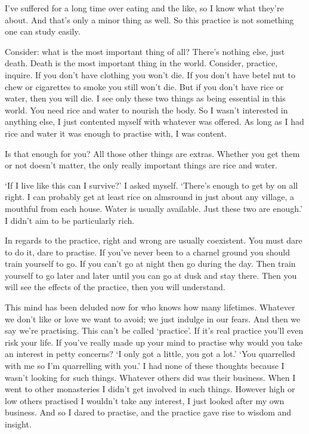 I've suffered for a long time over eating and the like, so I know what they're about. And that's only a minor thing as well. So this practice is not something one can study easily. 

Consider: what is the most important thing of all? There's nothing else, just death. Death is the most important thing in the world. Consider, practice, inquire. If you don't have clothing you won't die. If you don't have betel nut to chew or cigarettes to smoke you still won't die. But if you don't have rice or water, then you will die. I see only these two things as being essential in this world. You need rice and water to nourish the body. So I wasn't interested in anything else, I just contented myself with whatever was offered. As long as I had rice and water it was enough to practise with, I was content. 

Is that enough for you? All those other things are extras. Whether you get them or not doesn't matter, the only really important things are rice and water. 

`If I live like this can I survive?' I asked myself. `There's enough to get by on all right. I can probably get at least rice on almsround in just about any village, a mouthful from each house. Water is usually available. Just these two are enough.' I didn't aim to be particularly rich. 

In regards to the practice, right and wrong are usually coexistent. You must dare to do it, dare to practise. If you've never been to a charnel ground you should train yourself to go. If you can't go at night then go during the day. Then train yourself to go later and later until you can go at dusk and stay there. Then you will see the effects of the practice, then you will understand. 

This mind has been deluded now for who knows how many lifetimes. Whatever we don't like or love we want to avoid; we just indulge in our fears. And then we say we're practising. This can't be called `practice'. If it's real practice you'll even risk your life. If you've really made up your mind to practise why would you take an interest in petty concerns? `I only got a little, you got a lot.' `You quarrelled with me so I'm quarrelling with you.' I had none of these thoughts because I wasn't looking for such things. Whatever others did was their business. When I went to other monasteries I didn't get involved in such things. However high or low others practised I wouldn't take any interest, I just looked after my own business. And so I dared to practise, and the practice gave rise to wisdom and insight. 

